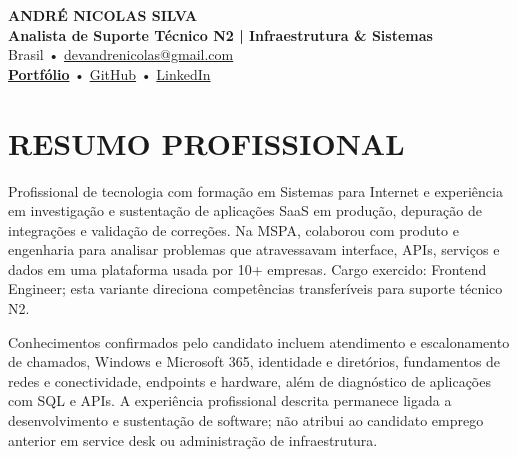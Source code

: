 \documentclass[10pt,a4paper]{article}
\begin{document}

\begin{center}

    {\LARGE \textbf{ANDRÉ NICOLAS SILVA}} \\[-2pt]

    {\normalsize \textbf{Analista de Suporte Técnico N2 | Infraestrutura \& Sistemas}} \\[1pt]

    \footnotesize
    Brasil \quad • \quad
    \href{mailto:devandrenicolas@gmail.com}{devandrenicolas@gmail.com} \\[-1pt]

    \textbf{\href{https://portfolio-andrenicolas.vercel.app}{Portfólio}}
    \quad • \quad
    \href{https://github.com/devAndreNicolas}{GitHub}
    \quad • \quad
    \href{https://www.linkedin.com/in/devandrenicolas}{LinkedIn}

\end{center}

\vspace{-3pt}


\section*{RESUMO PROFISSIONAL}

\footnotesize

Profissional de tecnologia com formação em Sistemas para Internet e experiência em investigação e sustentação de aplicações SaaS em produção, depuração de integrações e validação de correções. Na MSPA, colaborou com produto e engenharia para analisar problemas que atravessavam interface, APIs, serviços e dados em uma plataforma usada por 10+ empresas. Cargo exercido: Frontend Engineer; esta variante direciona competências transferíveis para suporte técnico N2.

Conhecimentos confirmados pelo candidato incluem atendimento e escalonamento de chamados, Windows e Microsoft 365, identidade e diretórios, fundamentos de redes e conectividade, endpoints e hardware, além de diagnóstico de aplicações com SQL e APIs. A experiência profissional descrita permanece ligada a desenvolvimento e sustentação de software; não atribui ao candidato emprego anterior em service desk ou administração de infraestrutura.
\end{document}

